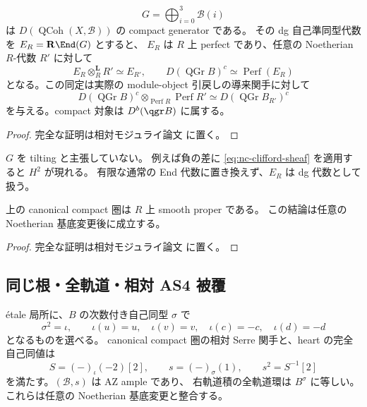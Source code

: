 \begin{proposition}\label{prop:nc-compact-generator}
\[
 G=\bigoplus_{i=0}^3\mathcal B(i)
\]
は $D(\operatorname{QCoh}(X,\mathcal B))$ の compact generator である。
その dg 自己準同型代数を $E_R=\mathbf R\End(G)$ とすると、
$E_R$ は $R$ 上 perfect であり、任意の Noetherian $R$-代数 $R'$ に対して
\[
 E_R\otimes_R^{\mathbf L}R'\simeq E_{R'},\qquad
 D(\operatorname{QGr} B)^c\simeq\operatorname{Perf}(E_R)
\]
となる。この同定は実際の module-object 引戻しの導来関手に対して
\[
 D(\operatorname{QGr} B)^c\otimes_{\operatorname{Perf} R}\operatorname{Perf} R'
 \simeq D(\operatorname{QGr} B_{R'})^c
 \tag{NCF-3}\label{eq:nc-perfect-basechange}
\]
を与える。compact 対象は $D^b(\qgr B)$ に属する。
\end{proposition}

\begin{proof}
完全な証明は相対モジュライ論文 \cite[\texttt{relative_noncubic_families}]{QuadricModuli2026} に置く。
\end{proof}

\begin{remark}
$G$ を tilting と主張していない。
例えば負の差に \eqref{eq:nc-clifford-sheaf} を適用すると $H^2$ が現れる。
有限な通常の End 代数に置き換えず、$E_R$ は dg 代数として扱う。
\end{remark}

\begin{proposition}\label{prop:nc-relative-smooth}
上の canonical compact 圏は $R$ 上 smooth proper である。
この結論は任意の Noetherian 基底変更後に成立する。
\end{proposition}

\begin{proof}
完全な証明は相対モジュライ論文 \cite[\texttt{relative_noncubic_families}]{QuadricModuli2026} に置く。
\end{proof}

\subsection{同じ根・全軌道・相対 AS4 被覆}

\begin{proposition}\label{prop:nc-root-ample-orbit}
étale 局所に、$B$ の次数付き自己同型 $\sigma$ で
\[
 \sigma^2=\iota,\qquad
 \iota(u)=u,\quad\iota(v)=v,\quad\iota(c)=-c,\quad\iota(d)=-d
\]
となるものを選べる。
canonical compact 圏の相対 Serre 関手と、heart の完全自己同値は
\[
 S=(-)_\iota(-2)[2],\qquad s=(-)_\sigma(1),\qquad s^2=S^{-1}[2]
\]
を満たす。$(\mathcal B,s)$ は AZ ample であり、
右軌道積の全軌道環は $B^\sigma$ に等しい。
これらは任意の Noetherian 基底変更と整合する。
\end{proposition}

